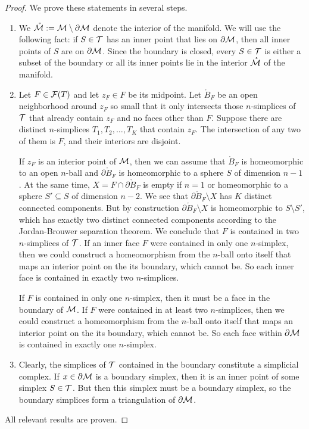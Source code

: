 \documentclass[12pt,a4paper]{article}
\begin{document}
\begin{proof}
    We prove these statements in several steps.
    \begin{enumerate}
    \item 
    We $\mathring {{\mathcal M}} := {\mathcal M} \setminus \partial {\mathcal M}$ denote the interior of the manifold. 
    We will use the following fact: if $S \in {\mathcal T}$ has an inner point that lies on $\partial {\mathcal M}$, then all inner points of $S$ are on $\partial {\mathcal M}$. 
    Since the boundary is closed, every $S \in {\mathcal T}$ is either a subset of the boundary or all its inner points lie in the interior $\mathring {{\mathcal M}}$ of the manifold. 
    
    \item
    Let $F \in {\mathcal F}(T)$ and let $z_F \in F$ be its midpoint. 
    Let $\mathring B_F$ be an open neighborhood around $z_F$ so small that it only intersects those $n$-simplices of ${\mathcal T}$ that already contain $z_F$ and no faces other than $F$.
    Suppose there are distinct $n$-simplices $T_1, T_2, \dots, T_K$ that contain $z_F$. 
    The intersection of any two of them is $F$, and their interiors are disjoint. 
    
    If $z_F$ is an interior point of ${\mathcal M}$, 
    then we can assume that $\mathring B_F$ is homeomorphic to an open $n$-ball and $\partial \mathring B_F$ is homeomorphic to a sphere $S$ of dimension $n-1$. 
    At the same time, $X = F \cap \partial \mathring B_F$ is empty if $n=1$ or homeomorphic to a sphere $S' \subseteq S$ of dimension $n-2$. %
    We see that $\partial \mathring B_F \setminus X$ has $K$ distinct connected components. 
    But by construction $\partial \mathring B_F \setminus X$ is homeomorphic to $S \setminus S'$,
    which has exactly two distinct connected components according to the Jordan-Brouwer separation theorem.
    We conclude that $F$ is contained in two $n$-simplices of ${\mathcal T}$.
    If an inner face $F$ were contained in only one $n$-simplex,
    then we could construct a homeomorphism from the $n$-ball onto itself that maps an interior point on the its boundary, which cannot be.
    So each inner face is contained in exactly two $n$-simplices. 
    
    If $F$ is contained in only one $n$-simplex, then it must be a face in the boundary of ${\mathcal M}$. 
    If $F$ were contained in at least two $n$-simplices,
    then we could construct a homeomorphism from the $n$-ball onto itself that maps an interior point on the its boundary, which cannot be.
    So each face within $\partial {\mathcal M}$ is contained in exactly one $n$-simplex. 
    
    \item
    Clearly, the simplices of ${\mathcal T}$ contained in the boundary constitute a simplicial complex. 
    If $x \in \partial {\mathcal M}$ is a boundary simplex, then it is an inner point of some simplex $S \in {\mathcal T}$.
    But then this simplex must be a boundary simplex, so the boundary simplices form a triangulation of $\partial {\mathcal M}$.
    \end{enumerate}
    All relevant results are proven. 
\end{proof}
\end{document}
